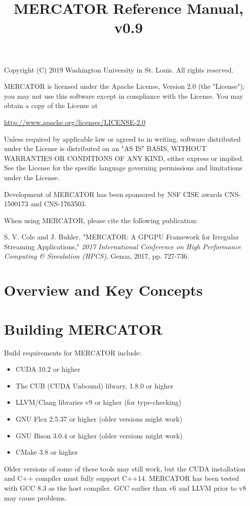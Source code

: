 \documentclass[11pt]{article}
\title{MERCATOR Reference Manual, v0.9}
\begin{document}
\maketitle

Copyright (C) 2019 Washington University in St. Louis.  All rights
reserved.

MERCATOR is licensed under the Apache License, Version 2.0 (the
"License"); you may not use this software except in compliance with
the License.  You may obtain a copy of the License at

  \url{http://www.apache.org/licenses/LICENSE-2.0}
	
Unless required by applicable law or agreed to in writing, software
distributed under the License is distributed on an "AS IS" BASIS,
WITHOUT WARRANTIES OR CONDITIONS OF ANY KIND, either express or implied.
See the License for the specific language governing permissions and
limitations under the License.


Development of MERCATOR has been sponsored by NSF CISE awards
CNS-1500173 and CNS-1763503.

When using MERCATOR, please cite the following publication:

S. V. Cole and J. Buhler, "MERCATOR: A GPGPU Framework for Irregular
Streaming Applications," \textit{2017 International Conference on High
  Performance Computing \& Simulation (HPCS)}, Genoa, 2017,
pp. 727-736.

\newpage

\section{Overview and Key Concepts}

\section{Building MERCATOR}

Build requirements for MERCATOR include:
\begin{itemize}

\item CUDA 10.2 or higher

\item The CUB (CUDA Unbound) library, 1.8.0 or higher

\item LLVM/Clang libraries v9 or higher (for type-checking)

\item GNU Flex 2.5.37 or higher (older versions might work)

\item GNU Bison 3.0.4 or higher (older versions might work)

\item CMake 3.8 or higher

\end{itemize}
Older versions of some of these tools may still work, but the CUDA
installation and C++ compiler must fully support C++14.  MERCATOR has
been tested with GCC 8.3 as the host compiler.  GCC earlier than v6
and LLVM prior to v8 may cause problems.
\end{document}
